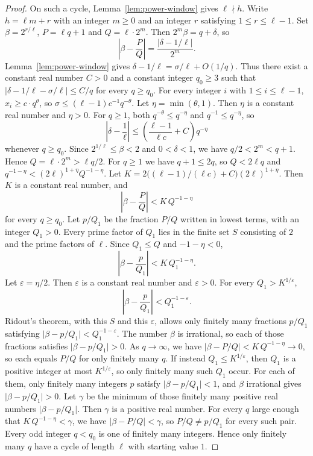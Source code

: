 \documentclass[11pt]{article}
\begin{document}
\begin{proof}
On such a cycle, Lemma~\ref{lem:power-window} gives $\ell \nmid h$.
Write $h = \ell m + r$ with an integer $m \ge 0$ and an integer $r$ satisfying $1 \le r \le \ell-1$.
Set $\beta = 2^{r/\ell}$, $P = \ell q + 1$ and $Q = \ell \cdot 2^m$.
Then $2^m \beta = q + \delta$, so
\[
\left|\beta - \frac{P}{Q}\right| = \frac{|\delta - 1/\ell|}{2^m}.
\]
Lemma~\ref{lem:power-window} gives $\delta - 1/\ell = \sigma/\ell + O(1/q)$.
Thus there exist a constant real number $C > 0$ and a constant integer $q_0 \ge 3$ such that $|\delta - 1/\ell - \sigma/\ell| \le C/q$ for every $q \ge q_0$.
For every integer $i$ with $1 \le i \le \ell-1$, $x_i \ge c \cdot q^\theta$, so $\sigma \le (\ell-1) c^{-1} q^{-\theta}$.
Let $\eta = \min(\theta, 1)$. Then $\eta$ is a constant real number and $\eta > 0$.
For $q \ge 1$, both $q^{-\theta} \le q^{-\eta}$ and $q^{-1} \le q^{-\eta}$, so
\[
\left|\delta - \frac1\ell\right| \le \left(\frac{\ell-1}{\ell c} + C\right) q^{-\eta}
\]
whenever $q \ge q_0$.
Since $2^{1/\ell} \le \beta < 2$ and $0 < \delta < 1$, we have $q/2 < 2^m < q+1$.
Hence $Q = \ell \cdot 2^m > \ell q/2$. For $q \ge 1$ we have $q+1 \le 2q$, so $Q < 2\ell q$ and $q^{-1-\eta} < (2\ell)^{1+\eta} Q^{-1-\eta}$.
Let $K = 2\bigl((\ell-1)/(\ell c) + C\bigr) (2\ell)^{1+\eta}$. Then $K$ is a constant real number, and
\[
\left|\beta - \frac{P}{Q}\right| < K\, Q^{-1-\eta}
\]
for every $q \ge q_0$.
Let $p/Q_1$ be the fraction $P/Q$ written in lowest terms, with an integer $Q_1 > 0$.
Every prime factor of $Q_1$ lies in the finite set $S$ consisting of $2$ and the prime factors of $\ell$.
Since $Q_1 \le Q$ and $-1-\eta < 0$,
\[
\left|\beta - \frac{p}{Q_1}\right| < K\, Q_1^{-1-\eta}.
\]
Let $\varepsilon = \eta/2$. Then $\varepsilon$ is a constant real number and $\varepsilon > 0$.
For every $Q_1 > K^{1/\varepsilon}$,
\[
\left|\beta - \frac{p}{Q_1}\right| < Q_1^{-1-\varepsilon}.
\]
Ridout's theorem, with this $S$ and this $\varepsilon$, allows only finitely many fractions $p/Q_1$ satisfying $\bigl|\beta - p/Q_1\bigr| < Q_1^{-1-\varepsilon}$.
The number $\beta$ is irrational, so each of those fractions satisfies $\bigl|\beta - p/Q_1\bigr| > 0$.
As $q \to \infty$, we have $|\beta - P/Q| < K\, Q^{-1-\eta} \to 0$, so each equals $P/Q$ for only finitely many $q$.
If instead $Q_1 \le K^{1/\varepsilon}$, then $Q_1$ is a positive integer at most $K^{1/\varepsilon}$, so only finitely many such $Q_1$ occur.
For each of them, only finitely many integers $p$ satisfy $\bigl|\beta - p/Q_1\bigr| < 1$, and $\beta$ irrational gives $\bigl|\beta - p/Q_1\bigr| > 0$.
Let $\gamma$ be the minimum of those finitely many positive real numbers $\bigl|\beta - p/Q_1\bigr|$. Then $\gamma$ is a positive real number.
For every $q$ large enough that $K\, Q^{-1-\eta} < \gamma$, we have $\bigl|\beta - P/Q\bigr| < \gamma$, so $P/Q \ne p/Q_1$ for every such pair.
Every odd integer $q < q_0$ is one of finitely many integers.
Hence only finitely many $q$ have a cycle of length $\ell$ with starting value $1$.
\end{proof}
\end{document}
